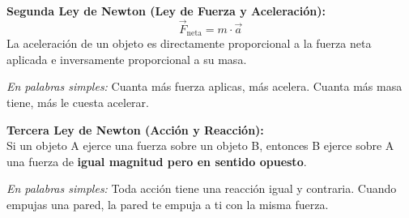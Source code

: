 \documentclass[12pt, a4paper]{article}
\begin{document}
\begin{cuadroteoria}
\textbf{Segunda Ley de Newton (Ley de Fuerza y Aceleración):}
$$\vec{F}_{\text{neta}} = m \cdot \vec{a}$$
La aceleración de un objeto es directamente proporcional a la fuerza neta aplicada e inversamente proporcional a su masa.

\textit{En palabras simples:} Cuanta más fuerza aplicas, más acelera. Cuanta más masa tiene, más le cuesta acelerar.
\end{cuadroteoria}

\newpage

\begin{cuadroteoria}
\textbf{Tercera Ley de Newton (Acción y Reacción):}\\
Si un objeto A ejerce una fuerza sobre un objeto B, entonces B ejerce sobre A una fuerza de \textbf{igual magnitud pero en sentido opuesto}.

\textit{En palabras simples:} Toda acción tiene una reacción igual y contraria. Cuando empujas una pared, la pared te empuja a ti con la misma fuerza.
\end{cuadroteoria}
\end{document}
